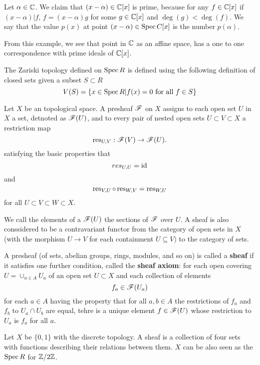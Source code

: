 	\begin{example}[Primes in $\C(X)$]
	Let $\alpha \in \mathbb{C}$.
	We claim that $(x - \alpha) \in \mathbb{C}[x]$ is prime,
	because for any $f \in \mathbb{C}[x]$ if $(x - \alpha) | f$,
	$f = (x - \alpha) g$ for some $g \in \mathbb{C}[x]$ and $\deg(g) < \deg(f)$.
	We say that the value $p(x)$ at point $(x - \alpha) \in \operatorname{Spec} C[x]$
	is the number $p(\alpha)$. 
	\end{example}
	From this example, we see that point in $\mathbb{C}$ as an affine space,
	has a one to one correspondence with prime ideals of $\mathbb{C}[x]$.
	
	\begin{definition}
		The Zariski topology defined on $\operatorname{Spec} R$ is defined 
		using the following definition of closed sets 
		given a subset $S \subset R$
		\[
		V(S) = \{x \in \operatorname{Spec} R | f(x) = 0 \text{ for all } f \in S\}
		\]
	\end{definition}
	
	
	\begin{definition}
		Let $X$ be an topological space.
		A presheaf $\mathscr F$ on $X$ assigns to each open set $U$ 
		in $X$ a set, 
		detnoted as $\mathscr F(U)$,
		and to every pair of nested open sets 
		$U \subset V \subset X$ a restriction map 
		\[
		\operatorname{res}_{U, V}: \mathscr F(V) \rightarrow \mathscr F(U).
		\]
		satisfying the basic properties that 
		\[
		res_{U, U} = \operatorname{id}
		\]
		and 
		\[
		\operatorname{res}_{V, U} \circ \operatorname{res}_{W, V} = \operatorname{res}_{W, U}
		\]
		for all $U \subset V \subset W \subset X$. 
	\end{definition}
	We call the elements of a $\mathscr F(U)$ the sections of $\mathscr F$ over $U$.
	A sheaf is also conssidered to be a contravariant functor 
	from the category of open sets in $X$ 
	(with the morphism $U \rightarrow V$ 
	for each containment $U \subseteq V)$
	to the category of sets. 
	
	\begin{definition}[Sheaf]
	A presheaf (of sets, abelian groups, rings, modules, 
	and so on) is called a \textbf{sheaf} 
	if it satisfies one further condition,
	called the \textbf{sheaf axiom}:
	for each open covering 
	$U = \cup_{a \in A} U_a$ of an open set $U \subset X$ 
	and each collection of elements 
	\[
	f_a \in \mathscr F(U_a) 
	\]
	for each $a \in A$
	having the property that for all $a, b \in A$ 
	the restrictions of $f_a$ and $f_b$ to $U_a \cap U_b$ 
	are equal,
	tehre is a unique element $f \in \mathscr F(U)$ whose restriction to $U_a$ 
	is $f_a$ for all $a$. 
	\end{definition}
	
	\begin{example}
		Let $X$ be $\{0,1\}$ with the discrete topology.
		A sheaf is a collection of four sets with functions 
		describing their relations between them.
		$X$ can be also seen as the $\operatorname{Spec} R$ for $\mathbb{Z}/2\mathbb{Z}$. 
	\end{example}
	
